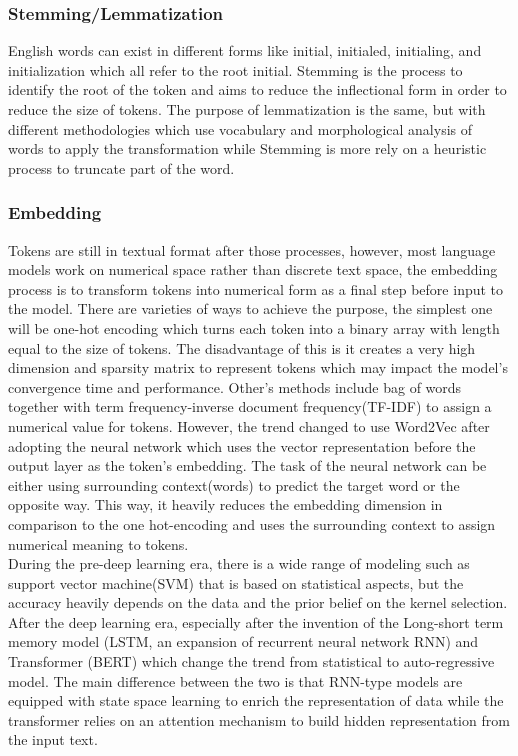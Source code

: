 \documentclass[12pt]{article}
\begin{document}
\subsubsection{Stemming/Lemmatization}
English words can exist in different forms like initial, initialed, initialing, and initialization which all refer to the root initial. Stemming is the process to identify the root of the token and aims to reduce the inflectional form in order to reduce  the size of tokens. The purpose of lemmatization is the same, but with different methodologies which use vocabulary and morphological analysis of words to apply the transformation while Stemming is more rely on a heuristic process to truncate part of the word.

\subsubsection{Embedding}
Tokens are still in textual format after those processes, however, most language models work on numerical space rather than discrete text space, the embedding process is to transform tokens into numerical form as a final step before input to the model. There are varieties of ways to achieve the purpose, the simplest one will be one-hot encoding which turns each token into a binary array with length equal to the size of tokens. The disadvantage of this is it creates a very high dimension and  sparsity matrix to represent tokens which may impact the model's convergence time and performance. Other's methods include bag of words together with term frequency-inverse document frequency(TF-IDF) to assign a numerical value for tokens. However, the trend changed to use Word2Vec after adopting the neural network which uses the vector representation before the output layer as the token's embedding. The task of the neural network can be either using surrounding context(words) to predict the target word or the opposite way. This way, it heavily reduces the embedding dimension in comparison to the one hot-encoding and uses the surrounding context to assign numerical meaning to tokens.\\
 
During the pre-deep learning era, there is a wide range of modeling such as support vector machine(SVM) that is based on statistical aspects, but the accuracy heavily depends on the data and the prior belief on the kernel selection. After the deep learning era, especially after the invention of the Long-short term memory model (LSTM, an expansion of recurrent neural network RNN) and Transformer (BERT) which change the trend from statistical to auto-regressive model.  The main difference between the two is that RNN-type models are equipped with state space learning\cite{Siegelmann_1995} to enrich the representation of data while the transformer relies on an attention mechanism to build hidden representation from the input text.\\
\end{document}
